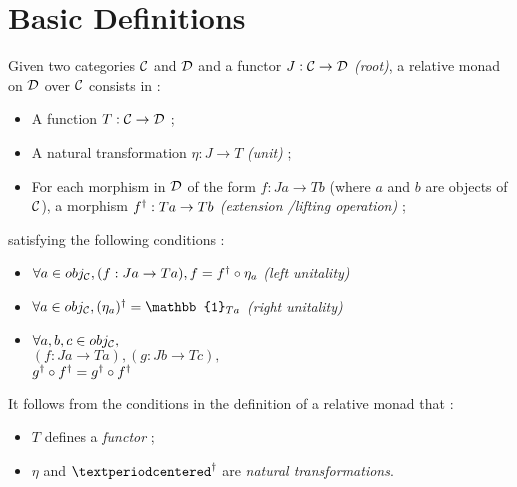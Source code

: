 \section{Basic Definitions}
\begin{definition}
  Given two categories $\mathcal{C}$ and $\mathcal{D}$ and a functor $J : \mathcal{C} \to \mathcal{D}$ \emph{(root)}, a relative monad on $\mathcal{D}$ over $\mathcal{C}$ consists in :
  \begin{itemize}
  \item A function $T : \mathcal{C} \to \mathcal{D}$ ;
  \item A natural transformation $\eta : J \to T$ \emph{(unit)} ;
    \item For each morphism in $\mathcal{D}$ of the form $f : J a \to T b$ (where $a$ and $b$ are objects of $\mathcal{C}$), a morphism $f^{\dagger} : T a \to T b$ \emph{(extension /lifting operation)} ;
  \end{itemize}
  satisfying the following conditions :
  \begin{itemize}
  \item $\forall a \in obj_{\mathcal{C}}, (f : J a \to T a), f = f^{\dagger} \circ \eta_a$
    \emph{(left unitality)}
  \item $\forall a \in obj_{\C}, \lift{(\eta_a)} = \mathbb{1}_{T a}$
    \emph{(right unitality)}
  \item $\forall a, b, c \in obj_{\mathcal{C}}, $\\
    $(f : J a \to T a), (g : J b \to T c),$\\
    $g^{\dagger}\circ f^{\dagger} = g^{\dagger} \circ f^{\dagger} $
    
  \end{itemize}

\begin{proposition}
  It follows from the conditions in the definition of a relative monad that :
  \begin{itemize}
  \item $T$ defines a \emph{functor} ;
    \item $\eta$ and $\lift{·}$ are \emph{natural transformations}.
    \end{itemize}
\end{proposition}
  
\end{definition}

\begin{definition}
\end{definition}

